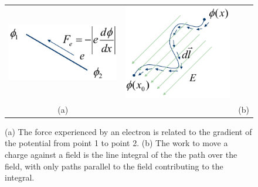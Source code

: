 \begin{figure}[tb]
\centering
\begin{tabular}{ccc}
\includegraphics[width=.25\columnwidth]{mod2-2_ICtech_sld_14} &
\hspace{3cm}
\includegraphics[width=.3\columnwidth]{mod2-2_ICtech_sld_15}\\
(a) & & (b)\\
\end{tabular}
\caption{(a)  The force experienced by an electron is related to the gradient of the potential from point 1 to point 2.  (b)  The work to move a charge against a field is the line integral of the the path over the field, with only paths parallel to the field contributing to the integral.}
\label{fig:mod2-2_ICtech_sld_14}
\end{figure}

